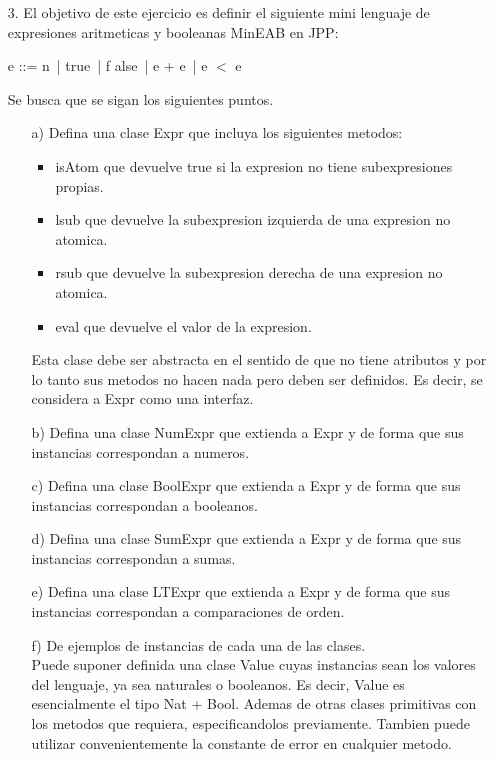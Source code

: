 \documentclass{article}
\begin{document}
    \begin{itemize}
        \item[3.] El objetivo de este ejercicio es definir el siguiente mini lenguaje de expresiones aritmeticas y booleanas MinEAB en JPP:
        \begin{center}
            \center e ::= n \,| true \,| f alse \,| e + e \,| e $<$ e
        \end{center}

        Se busca que se sigan los siguientes puntos.

        \begin{itemize}
            \item[a)] Defina una clase Expr que incluya los siguientes metodos:
                \begin{itemize}
                    \item isAtom que devuelve true si la expresion no tiene subexpresiones propias.
                    \item lsub que devuelve la subexpresion izquierda de una expresion no atomica.
                    \item rsub que devuelve la subexpresion derecha de una expresion no atomica.
                    \item eval que devuelve el valor de la expresion.
                \end{itemize}
            Esta clase debe ser abstracta en el sentido de que no tiene atributos y por lo tanto sus metodos no hacen nada pero deben ser definidos. Es decir, se considera a Expr como una interfaz.
            \item[b)] Defina una clase NumExpr que extienda a Expr y de forma que sus instancias correspondan a numeros.
            \item[c)] Defina una clase BoolExpr que extienda a Expr y de forma que sus instancias correspondan a booleanos.
            \item[d)] Defina una clase SumExpr que extienda a Expr y de forma que sus instancias correspondan a sumas.
            \item[e)] Defina una clase LTExpr que extienda a Expr y de forma que sus instancias correspondan a comparaciones de orden.
            \item[f)] De ejemplos de instancias de cada una de las clases.\\
            Puede suponer definida una clase Value cuyas instancias sean los valores del lenguaje, ya sea naturales o booleanos. Es decir, Value es esencialmente el tipo Nat + Bool. Ademas de otras clases primitivas con los metodos que requiera, especificandolos previamente. Tambien puede utilizar convenientemente la constante de error en cualquier metodo.
        \end{itemize}
    \end{itemize}
\end{document}
